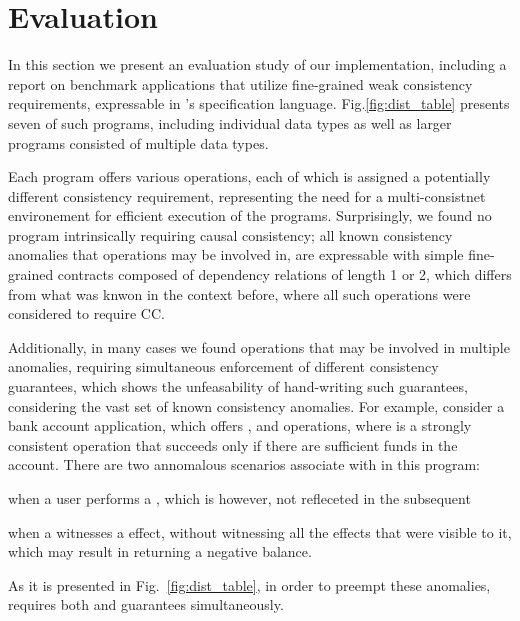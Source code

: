 \newpage
\section{Evaluation}
\label{sec:eval}
%

In this section we present an evaluation study of our implementation,
including a report on
benchmark applications that utilize fine-grained weak consistency
requirements, expressable
in \tool's specification language.
Fig.\ref{fig:dist_table} presents seven of such programs, including
individual data types as well as larger programs consisted of multiple
data types. 

Each program offers various operations, each of which is assigned a
potentially different consistency requirement,
representing the need for a multi-consistnet environement for
efficient execution of the programs. Surprisingly, we found no program
intrinsically requiring causal consistency; all known consistency anomalies that operations
may be involved in, are expressable with simple fine-grained contracts
composed of
dependency relations of length 1 or 2,
which differs from what was knwon in the context before, where all such
operations were considered to require CC.

Additionally, in many cases we found operations that may be involved in
multiple anomalies, requiring simultaneous enforcement of different
consistency guarantees, which shows the unfeasability of hand-writing
such guarantees, considering the vast set of known consistency
anomalies. 
%
For example, consider  a bank account application, which offers
\dRV{}, \wdRV{} and \gbRV{} operations, where \wdRV{} is a
strongly consistent operation that succeeds only if there are sufficient
funds in the account. There are two annomalous scenarios associate with
\gbRV{} in this program:
\begin{enumerate*}[label=(\roman*)]
\item when a user performs a \dRV{}, which is however, not refleceted
in the subsequent \gbRV{}
\item when a \gbRV{} witnesses a \wdRV{} effect, without witnessing all
the \dRV{} effects that were visible to it,
which may result in \gbRV{} returning a
negative balance.
\end{enumerate*}
As it is presented in Fig.~\ref{fig:dist_table}, in order to preempt
these anomalies, \gbRV{} requires
both \rmwCTRT{} and \visCTRT{} guarantees simultaneously.



